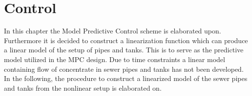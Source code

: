 \chapter{Control}\label{ch:control}

In this chapter the Model Predictive Control scheme is elaborated upon. %
Furthermore it is decided to construct a linearization function which can produce a linear model of the setup of pipes and tanks. This is to serve as the predictive model utilized in the MPC design.  
Due to time constraints a linear model containing flow of concentrate in sewer pipes and tanks has not been developed. 
In the following, the procedure to construct a linearized model of the sewer pipes and tanks from the nonlinear setup is elaborated on.



